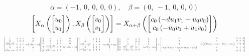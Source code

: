 \documentclass[11pt]{article}
\theoremstyle{definition}
\begin{document}
\[
\alpha = \left( -1, \  0, \  0, \  0, \  0\right), \quad \beta = \left( 0, \  -1, \  0, \  0, \  0\right)
\]
\[
\scaletoalign{\textwidth}{\left[ X_{\alpha}\left(\left[\begin{matrix}u_{0}\\u_{1}\end{matrix}\right]\right), X_{\beta}\left(\left[\begin{matrix}v_{0}\\v_{1}\end{matrix}\right]\right) \right] = X_{\alpha + \beta}\left(\left[\begin{matrix}c_{0} \left(- d u_{1} v_{1} + u_{0} v_{0}\right)\\c_{0} \left(- u_{0} v_{1} + u_{1} v_{0}\right)\end{matrix}\right]\right)}
\]
\[
\scaletoalign{\textwidth}{{\left[\begin{matrix}1 & 0 & 0 & 0 & 0\\0 & 1 & 0 & 0 & 0\\\frac{c_{0} \left(d u_{1}^{2} - u_{0}^{2}\right)}{2} & 0 & 1 & 0 & c_{0} \left(\sqrt{d} u_{1} - u_{0}\right)\\0 & 0 & 0 & 1 & 0\\\sqrt{d} u_{1} + u_{0} & 0 & 0 & 0 & 1\end{matrix}\right]} {\left[\begin{matrix}1 & 0 & 0 & 0 & 0\\0 & 1 & 0 & 0 & 0\\0 & 0 & 1 & 0 & 0\\0 & \frac{c_{0} \left(d v_{1}^{2} - v_{0}^{2}\right)}{2} & 0 & 1 & c_{0} \left(\sqrt{d} v_{1} - v_{0}\right)\\0 & \sqrt{d} v_{1} + v_{0} & 0 & 0 & 1\end{matrix}\right]} {\left[\begin{matrix}1 & 0 & 0 & 0 & 0\\0 & 1 & 0 & 0 & 0\\\frac{c_{0} d u_{1}^{2}}{2} - \frac{c_{0} u_{0}^{2}}{2} & 0 & 1 & 0 & - c_{0} \sqrt{d} u_{1} + c_{0} u_{0}\\0 & 0 & 0 & 1 & 0\\- \sqrt{d} u_{1} - u_{0} & 0 & 0 & 0 & 1\end{matrix}\right]} {\left[\begin{matrix}1 & 0 & 0 & 0 & 0\\0 & 1 & 0 & 0 & 0\\0 & 0 & 1 & 0 & 0\\0 & \frac{c_{0} d v_{1}^{2}}{2} - \frac{c_{0} v_{0}^{2}}{2} & 0 & 1 & - c_{0} \sqrt{d} v_{1} + c_{0} v_{0}\\0 & - \sqrt{d} v_{1} - v_{0} & 0 & 0 & 1\end{matrix}\right]} = {\left[\begin{matrix}1 & 0 & 0 & 0 & 0\\0 & 1 & 0 & 0 & 0\\0 & - c_{0} \left(\sqrt{d} \left(u_{0} v_{1} - u_{1} v_{0}\right) - d u_{1} v_{1} + u_{0} v_{0}\right) & 1 & 0 & 0\\- c_{0} \left(\sqrt{d} \left(u_{0} v_{1} - u_{1} v_{0}\right) + d u_{1} v_{1} - u_{0} v_{0}\right) & 0 & 0 & 1 & 0\\0 & 0 & 0 & 0 & 1\end{matrix}\right]}}
\]
\end{document}
